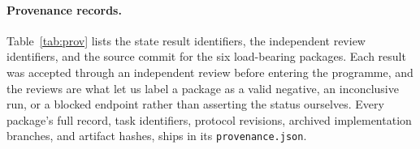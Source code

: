 \paragraph{Provenance records.} Table~\ref{tab:prov} lists the state result identifiers, the
independent review identifiers, and the source commit for the six load-bearing packages. Each
result was accepted through an independent review before entering the programme, and the
reviews are what let us label a package as a valid negative, an inconclusive run, or a blocked
endpoint rather than asserting the status ourselves. Every package's full record, task
identifiers, protocol revisions, archived implementation branches, and artifact hashes, ships in its \texttt{provenance.json}.


